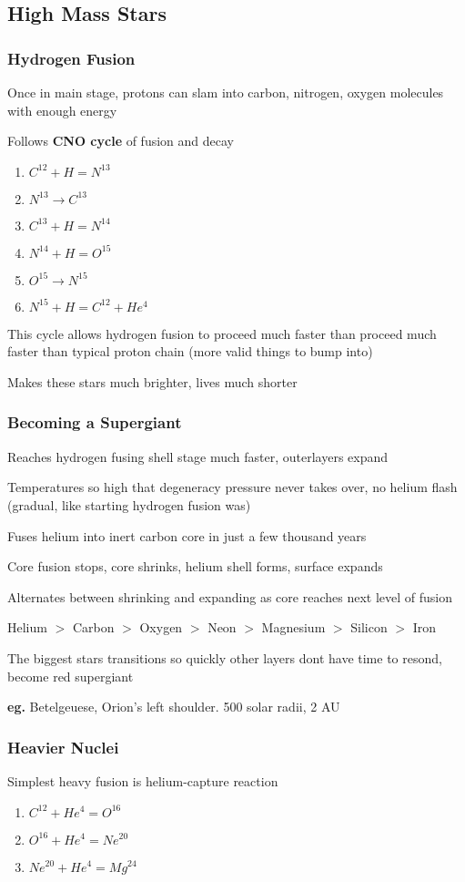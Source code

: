 \subsection{High Mass Stars}
\subsubsection{Hydrogen Fusion}
Once in main stage, protons can slam into carbon, nitrogen, oxygen molecules with enough energy

Follows {\bf CNO cycle} of fusion and decay
\begin{enumerate}
\item $C^{12} + H = N^{13}$
\item $N^{13} \to C^{13}$
\item $C^{13} + H = N^{14}$
\item $N^{14} + H = O^{15}$
\item $O^{15} \to N^{15}$
\item $N^{15} + H = C^{12} + He^{4}$
\end{enumerate}

This cycle allows hydrogen fusion to proceed much faster than proceed much faster than typical proton chain (more valid things to bump into)

Makes these stars much brighter, lives much shorter

\subsubsection{Becoming a Supergiant}
Reaches hydrogen fusing shell stage much faster, outerlayers expand

Temperatures so high that degeneracy pressure never takes over, no helium flash (gradual, like starting hydrogen fusion was)

Fuses helium into inert carbon core in just a few thousand years

Core fusion stops, core shrinks, helium shell forms, surface expands

Alternates between shrinking and expanding as core reaches next level of fusion

Helium $>$ Carbon $>$ Oxygen $>$ Neon $>$ Magnesium $>$ Silicon $>$ Iron

The biggest stars transitions so quickly other layers dont have time to resond, become red supergiant

{\bf eg.} Betelgeuese, Orion's left shoulder. 500 solar radii, 2 AU

\subsubsection{Heavier Nuclei}
Simplest heavy fusion is helium-capture reaction
\begin{enumerate}
\item $C^{12}+ He^{4} = O^{16}$
\item $O^{16}+ He^{4} = Ne^{20}$
\item $Ne^{20}+ He^{4} = Mg^{24}$
\end{enumerate}

